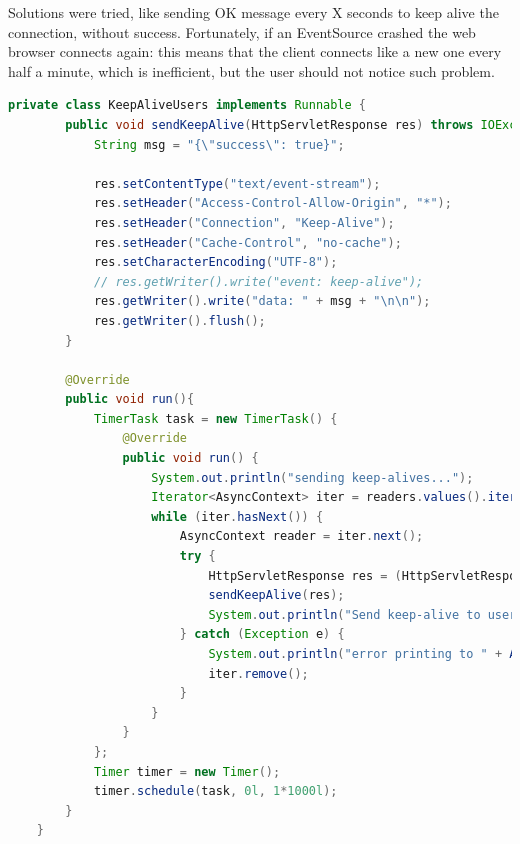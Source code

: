 \documentclass[12pt, a4paper]{article}
\begin{document}
  Solutions were tried, like sending OK message every X seconds to keep alive the connection, without success. Fortunately, if an EventSource crashed the web browser connects again: this means that the client connects like a new one every half a minute, which is inefficient, but the user should not notice such problem.

  \begin{lstlisting}[language=java, caption={example of class used to send keep alive messages, which works but does not solve the problem}]
    private class KeepAliveUsers implements Runnable {
        public void sendKeepAlive(HttpServletResponse res) throws IOException {
            String msg = "{\"success\": true}";

            res.setContentType("text/event-stream");
            res.setHeader("Access-Control-Allow-Origin", "*");
            res.setHeader("Connection", "Keep-Alive");
            res.setHeader("Cache-Control", "no-cache");
            res.setCharacterEncoding("UTF-8");
            // res.getWriter().write("event: keep-alive");
            res.getWriter().write("data: " + msg + "\n\n");
            res.getWriter().flush();
        }

        @Override
        public void run(){
            TimerTask task = new TimerTask() {
                @Override
                public void run() {
                    System.out.println("sending keep-alives...");
                    Iterator<AsyncContext> iter = readers.values().iterator();
                    while (iter.hasNext()) {
                        AsyncContext reader = iter.next();
                        try {
                            HttpServletResponse res = (HttpServletResponse) reader.getResponse();
                            sendKeepAlive(res);
                            System.out.println("Send keep-alive to user: " + ACToString(reader));
                        } catch (Exception e) {
                            System.out.println("error printing to " + ACToString(reader));
                            iter.remove();
                        }
                    }
                }
            };
            Timer timer = new Timer();
            timer.schedule(task, 0l, 1*1000l);
        }
    } 
  \end{lstlisting}
\end{document}
